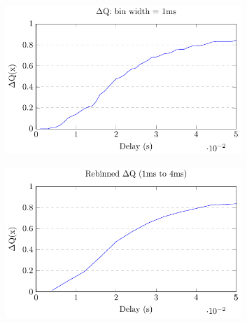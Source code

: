                       \begin{figure}[H]
            \centering
            \begin{subfigure}{.5\textwidth}
                \centering
                \includegraphics[width =0.98\textwidth]{tikz/cdf.pdf}
                \label{fig:nrb}
            \end{subfigure}%
            \begin{subfigure}{.5\textwidth}%
                \centering%
                \includegraphics[width =0.98\textwidth]{tikz/rebinned_cdf.pdf}%
                \label{fig:sub2}%
            \end{subfigure}%
            \label{fig:w1w2hb}%
            \end{figure}%


